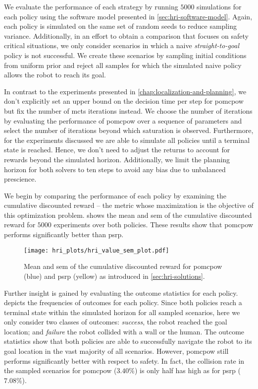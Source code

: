 We evaluate the performance of each strategy by running $5000$ simulations for
each policy using the software model presented in
\cref{sec:hri-software-model}. Again, each policy is simulated on the same set
of random seeds to reduce sampling variance. Additionally, in an effort to
obtain a comparison that focuses on safety critical situations, we only
consider scenarios in which a naive \emph{straight-to-goal} policy is not
successful. We create these scenarios by sampling initial conditions from
uniform prior and reject all samples for which the simulated naive policy
allows the robot to reach its goal.

In contrast to the experiments presented in
\cref{chap:localization-and-planning}, we don't explicitly set an upper bound
on the decision time per step for \ac{pomcpow} but fix the number of
\ac{mcts} iterations instead. We choose the number of iterations by evaluating the
performance of \ac{pomcpow} over a sequence of parameters and select the number
of iterations beyond which saturation is observed. Furthermore, for the
experiments discussed we are able to simulate all policies until a terminal
state is reached. Hence, we don't need to adjust the returns to account for
rewards beyond the simulated horizon. Additionally, we limit the planning horizon
for both solvers to ten steps to avoid any bias due to unbalanced prescience.

We begin by comparing the performance of each policy by examining the
cumulative discounted reward -- the metric whose maximization is the objective
of this optimization problem.  shows the mean and
\ac{sem} of the cumulative discounted reward for $5000$ experiments over both
policies. These results show that \ac{pomcpow} performs significantly better
than \ac{psrp}.

\begin{figure}[htpb]
  \centering
  \texttt{[image: hri\_plots/hri\_value\_sem\_plot.pdf]}
  \caption{Mean and \acf{sem} of the cumulative discounted reward for
  \ac{pomcpow} (blue) and \ac{psrp} (yellow) as introduced in \cref{sec:hri-solutions}.}
  \label{fig:hri_eval_value_sem}
\end{figure}

Further insight is gained by evaluating the outcome statistics for each policy.
 depicts the frequencies of outcomes for each
policy. Since both policies reach a terminal state within the simulated horizon
for all sampled scenarios, here we only consider two classes of outcomes:
\emph{success}, the robot reached the goal location; and \emph{failure} the
robot collided with a wall or the human. The outcome statistics show that both
policies are able to successfully navigate the robot to its goal location in
the vast majority of all scenarios. However, \ac{pomcpow} still performs
significantly better with respect to safety. In fact, the collision rate in the
sampled scenarios for \ac{pomcpow} ($3.40\%$) is only half has high as for
\ac{psrp} ($7.08\%$).

